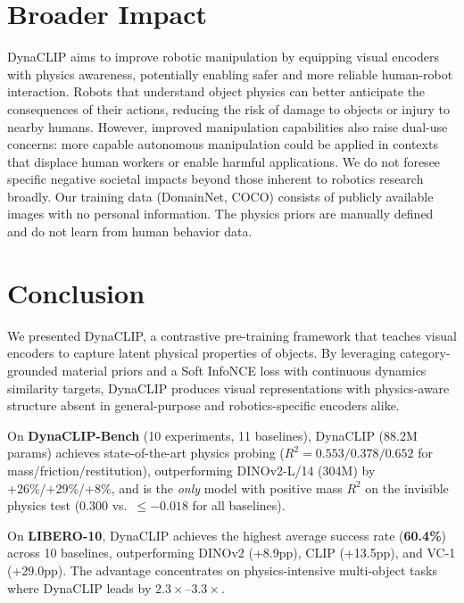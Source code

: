 \documentclass{article}
\newcommand{\methodname}{DynaCLIP}
\newcommand{\best}[1]{\textbf{#1}}
\begin{document}
\section{Broader Impact}
\label{sec:broader_impact}

\methodname{} aims to improve robotic manipulation by equipping visual encoders with physics awareness, potentially enabling safer and more reliable human-robot interaction. Robots that understand object physics can better anticipate the consequences of their actions, reducing the risk of damage to objects or injury to nearby humans. However, improved manipulation capabilities also raise dual-use concerns: more capable autonomous manipulation could be applied in contexts that displace human workers or enable harmful applications. We do not foresee specific negative societal impacts beyond those inherent to robotics research broadly. Our training data (DomainNet, COCO) consists of publicly available images with no personal information. The physics priors are manually defined and do not learn from human behavior data.


\section{Conclusion}
\label{sec:conclusion}

We presented \methodname{}, a contrastive pre-training framework that teaches visual encoders to capture latent physical properties of objects. By leveraging category-grounded material priors and a Soft InfoNCE loss with continuous dynamics similarity targets, \methodname{} produces visual representations with physics-aware structure absent in general-purpose and robotics-specific encoders alike.

On \textbf{DynaCLIP-Bench} (10 experiments, 11 baselines), \methodname{} (88.2M params) achieves state-of-the-art physics probing ($R^2{=}0.553/0.378/0.652$ for mass/friction/restitution), outperforming DINOv2-L/14 (304M) by +26\%/+29\%/+8\%, and is the \emph{only} model with positive mass $R^2$ on the invisible physics test ($0.300$ vs.\ $\le -0.018$ for all baselines).

On \textbf{LIBERO-10}, \methodname{} achieves the highest average success rate (\best{60.4\%}) across 10 baselines, outperforming DINOv2 (+8.9pp), CLIP (+13.5pp), and VC-1 (+29.0pp). The advantage concentrates on physics-intensive multi-object tasks where \methodname{} leads by $2.3\times$--$3.3\times$.
\end{document}

